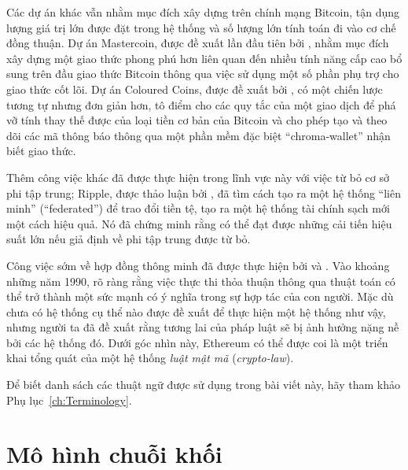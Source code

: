 \documentclass[9pt,oneside]{amsart}
\begin{document}
\begin{multicols}{2}
Các dự án khác vẫn nhằm mục đích xây dựng trên chính mạng Bitcoin, tận dụng lượng giá trị lớn được đặt trong hệ thống và số lượng lớn tính toán đi vào cơ chế đồng thuận. Dự án Mastercoin, được đề xuất lần đầu tiên bởi \cite{mastercoin2013willett}, nhằm mục đích xây dựng một giao thức phong phú hơn liên quan đến nhiều tính năng cấp cao bổ sung trên đầu giao thức Bitcoin thông qua việc sử dụng một số phần phụ trợ cho giao thức cốt lõi. Dự án Coloured Coins, được đề xuất bởi \cite{colouredcoins2012rosenfeld}, có một chiến lược tương tự nhưng đơn giản hơn, tô điểm cho các quy tắc của một giao dịch để phá vỡ tính thay thế được của loại tiền cơ bản của Bitcoin và cho phép tạo và theo dõi các mã thông báo thông qua một phần mềm đặc biệt ``chroma-wallet'' nhận biết giao thức.

Thêm công việc khác đã được thực hiện trong lĩnh vực này với việc từ bỏ cơ sở phi tập trung; Ripple, được thảo luận bởi \cite{boutellier2014pirates}, đã tìm cách tạo ra một hệ thống ``liên minh'' (``federated'') để trao đổi tiền tệ, tạo ra một hệ thống tài chính sạch mới một cách hiệu quả. Nó đã chứng minh rằng có thể đạt được những cải tiến hiệu suất lớn nếu giả định về phi tập trung được từ bỏ.

Công việc sớm về hợp đồng thông minh đã được thực hiện bởi \cite{szabo1997formalizing} và \cite{miller1997future}. Vào khoảng những năm 1990, rõ ràng rằng việc thực thi thỏa thuận thông qua thuật toán có thể trở thành một sức mạnh có ý nghĩa trong sự hợp tác của con người. Mặc dù chưa có hệ thống cụ thể nào được đề xuất để thực hiện một hệ thống như vậy, nhưng người ta đã đề xuất rằng tương lai của pháp luật sẽ bị ảnh hưởng nặng nề bởi các hệ thống đó. Dưới góc nhìn này, Ethereum có thể được coi là một triển khai tổng quát của một hệ thống \textit{luật mật mã} (\textit{crypto-law}).

Để biết danh sách các thuật ngữ được sử dụng trong bài viết này, hãy tham khảo Phụ lục~\ref{ch:Terminology}.

\section{Mô hình chuỗi khối} \label{ch:overview}


\end{multicols}
\end{document}
